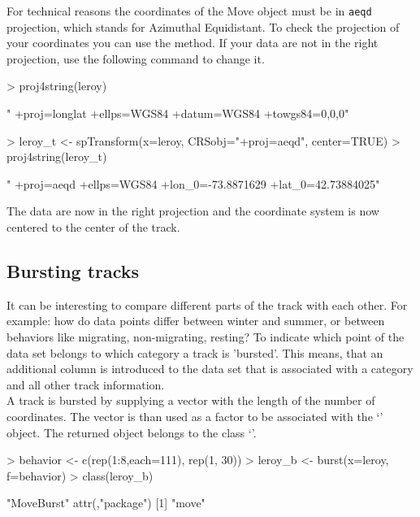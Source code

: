 \documentclass[article,nojss]{jss}
\newcommand{\fct}[1]{{\code{#1()}}}
\newcommand{\class}[1]{{`\code{#1}'}}
\begin{document}
For technical reasons the coordinates of the Move object must be in \texttt{aeqd} projection, which stands for Azimuthal Equidistant. To check the projection of your coordinates you can use the \fct{proj4string} method. If your data are not in the right projection, use the following command to change it. 

\begin{Schunk}
\begin{Sinput}
> proj4string(leroy)
\end{Sinput}
\begin{Soutput}
[1] " +proj=longlat +ellps=WGS84 +datum=WGS84 +towgs84=0,0,0"
\end{Soutput}
\begin{Sinput}
> leroy_t <- spTransform(x=leroy, CRSobj="+proj=aeqd", center=TRUE)  
> proj4string(leroy_t)
\end{Sinput}
\begin{Soutput}
[1] " +proj=aeqd +ellps=WGS84 +lon_0=-73.8871629 +lat_0=42.73884025"
\end{Soutput}
\end{Schunk}

The data are now in the right projection and the coordinate system is now centered to the center of the track. 


\subsection{Bursting tracks}
It can be interesting to compare different parts of the track with each other. For example: how do data points differ between winter and summer, or between behaviors like migrating, non-migrating, resting? To indicate which point of the data set belongs to which category a track is 'bursted'. This means, that an additional column is introduced to the data set that is associated with a category and all other track information. \\
A track is bursted by supplying a vector with the length of the number of coordinates. The vector is than used as a factor to be associated with the \class{Move} object. The returned object belongs to the class \class{MoveBurst}. 

\begin{Schunk}
\begin{Sinput}
> behavior <- c(rep(1:8,each=111), rep(1, 30))
> leroy_b <- burst(x=leroy, f=behavior)
> class(leroy_b)
\end{Sinput}
\begin{Soutput}
[1] "MoveBurst"
attr(,"package")
[1] "move"
\end{Soutput}
\end{Schunk}
\end{document}
